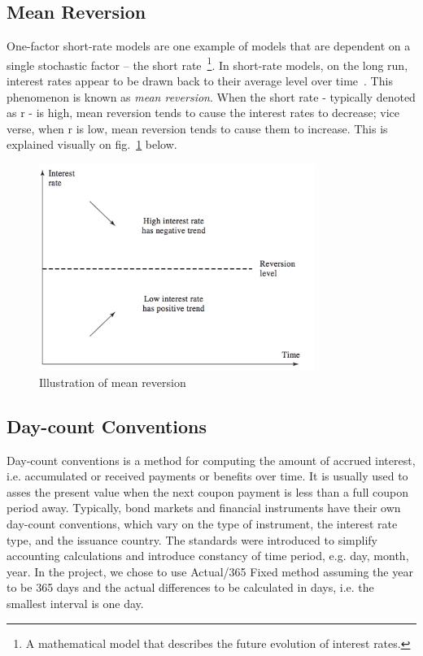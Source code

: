 \subsection{Mean Reversion}
One-factor short-rate models are one example of models that are dependent on a single stochastic factor – the short rate~\footnote{A mathematical model that describes the future evolution of interest rates.}. In short-rate models, on the long run, interest rates appear to be drawn back to their average level over time~.\cite[pg. 684]{ofod} This phenomenon is known as \textit{mean reversion}. When the short rate - typically denoted as r - is high, mean reversion tends to cause the interest rates to decrease; vice verse, when r is low, mean reversion tends to cause them to increase. This is explained visually on fig.~\ref{fig:background:meanreversion} below. 

\begin{figure}[H]
	\centering
	\includegraphics[width=0.8\textwidth]{img/meanreversion.png}
	\caption{Illustration of mean reversion}
	\label{fig:background:meanreversion}
\end{figure}

\subsection{Day-count Conventions}

Day-count conventions is a method for computing the amount of accrued interest, i.e. accumulated or received payments or benefits over time. It is usually used to asses the present value when the next coupon payment is less than a full coupon period away. Typically, bond markets and financial instruments have their own day-count conventions, which vary on the type of instrument, the interest rate type, and the issuance country. The standards were introduced to simplify accounting calculations and introduce constancy of time period, e.g. day, month, year. In the project, we chose to use Actual/365 Fixed method assuming the year to be 365 days and the actual differences to be calculated in days, i.e. the smallest interval is one day.

